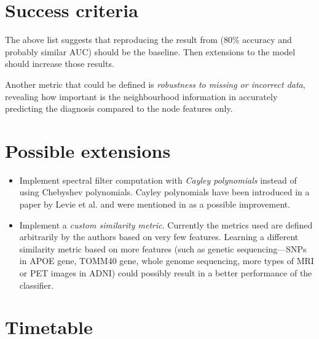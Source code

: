 \documentclass[12pt,a4paper,twoside]{article}
\begin{document}
\section*{Success criteria}




The above list suggests that reproducing the result from \cite{parisot2018disease} (80\% accuracy and probably similar AUC) should be the baseline. Then extensions to the model should increase those results.

Another metric that could be defined is \textit{robustness to missing or incorrect data}, revealing how important is the neighbourhood information in accurately predicting the diagnosis compared to the node features only.

\section*{Possible extensions}
\begin{itemize}
  \item Implement spectral filter computation with \textit{Cayley polynomials} instead of using Chebyshev polynomials. Cayley polynomials have been introduced in a paper by Levie et al. \cite{levie2017cayleynets} and were mentioned in \cite{parisot2018disease} as a possible improvement.
  \item Implement a \textit{custom similarity metric}. Currently the metrics used are defined arbitrarily by the authors based on very few features. Learning a different similarity metric based on more features (such as genetic sequencing—SNPs in APOE gene, TOMM40 gene, whole genome sequencing, more types of MRI or PET images in ADNI) could possibly result in a better performance of the classifier.
\end{itemize}


\section*{Timetable}
\label{section:timetable}
\end{document}
